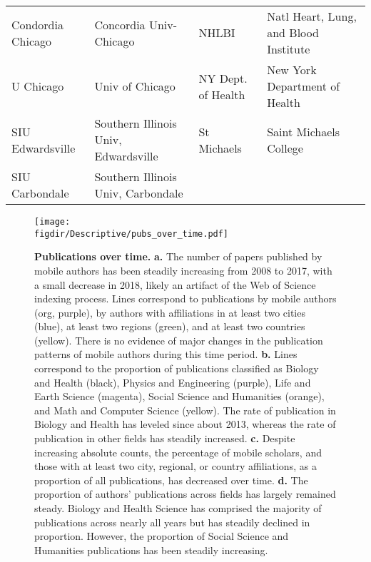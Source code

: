 \documentclass[12pt]{article} %
\def\figdir{../Figs}
\begin{document}
\begin{table}[ht]
\begin{adjustwidth}{-2cm}{}
\begin{tabular}{llll}
  Condordia Chicago & Concordia Univ-Chicago & NHLBI & Natl Heart, Lung, and Blood Institute \\ 
  U Chicago & Univ of Chicago & NY Dept. of Health & New York Department of Health \\ 
  SIU Edwardsville & Southern Illinois Univ, Edwardsville & St Michaels & Saint Michaels College \\ 
  SIU Carbondale & Southern Illinois Univ, Carbondale &  &  \\ 
   \hline
\end{tabular}
\endgroup
\end{adjustwidth}
\end{table}


\newpage
%
%
\begin{figure}[p!]
	\centering
	\texttt{[image: \\figdir/Descriptive/pubs\_over\_time.pdf]}
	\caption{
		\textbf{Publications over time.}
		\textbf{a.}
		The number of papers published by mobile authors has been steadily increasing from 2008 to 2017, with a small decrease in 2018,  likely an artifact of the Web of Science indexing process.
		Lines correspond to publications by mobile authors (org, purple), by authors with affiliations in at least two cities (blue), at least two regions (green), and at least two countries (yellow).
		There is no evidence of major changes in the publication patterns of mobile authors during this time period.
		\textbf{b.}
		Lines correspond to the proportion of publications classified as Biology and Health (black), Physics and Engineering (purple), Life and Earth Science (magenta), Social Science and Humanities (orange), and Math and Computer Science (yellow).
		The rate of publication in Biology and Health has leveled since about 2013, whereas the rate of publication in other fields has steadily increased.
		\textbf{c.}
		Despite increasing absolute counts, the percentage of mobile scholars, and those with at least two city, regional, or country affiliations, as a proportion of all publications, has decreased over time.
		\textbf{d.}
		The proportion of authors' publications across fields has largely remained steady.
		Biology and Health Science has comprised the majority of publications across nearly all years but has steadily declined in proportion.
		However, the proportion of Social Science and Humanities publications has been steadily increasing.
	}
	\label{fig:supp:pubs_over_time}
\end{figure}
\end{document}

